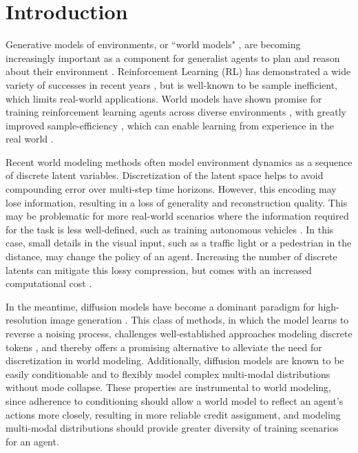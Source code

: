 \section{Introduction}
\label{sec:introduction}

Generative models of environments, or ``world models" \citep{ha2018world}, are becoming increasingly important as a component for generalist agents to plan and reason about their environment \citep{lecun2022path}. Reinforcement Learning (RL) has demonstrated a wide variety of successes in recent years \citep{alphago,degrave2022magnetic,ouyang2022training}, but is well-known to be sample inefficient, which limits real-world applications. World models have shown promise for training reinforcement learning agents across diverse environments \citep{hafner2023dreamerv3,muzero2020}, with greatly improved sample-efficiency \citep{ye2021efficientzero}, which can enable learning from experience in the real world \citep{wu2023daydreamer}.



Recent world modeling methods \citep{hafner2021mastering,iris2023,robine2023transformer,hafner2023dreamerv3,zhang2023storm} often model environment dynamics as a sequence of discrete latent variables. Discretization of the latent space helps to avoid compounding error over multi-step time horizons. However, this encoding may lose information, resulting in a loss of generality and reconstruction quality. This may be problematic for more real-world scenarios where the information required for the task is less well-defined, such as training autonomous vehicles \citep{hu2023gaia}. In this case, small details in the visual input, such as a traffic light or a pedestrian in the distance, may change the policy of an agent. Increasing the number of discrete latents can mitigate this lossy compression, but comes with an increased computational cost \citep{iris2023}. 

In the meantime, diffusion models \citep{sohl2015difforigin,ho2020DDPM,song_sde} have become a dominant paradigm for high-resolution image generation \citep{ldm_stable_diffusion,podell2023sdxl}. This class of methods, in which the model learns to reverse a noising process, challenges well-established approaches modeling discrete tokens \citep{esser2021taming,ramesh2021zero,muse2023}, and thereby offers a promising alternative to alleviate the need for discretization in world modeling. Additionally, diffusion models are known to be easily conditionable and to flexibly model complex multi-modal distributions without mode collapse. These properties are instrumental to world modeling, since adherence to conditioning should allow a world model to reflect an agent's actions more closely, resulting in more reliable credit assignment, and modeling multi-modal distributions should provide greater diversity of training scenarios for an agent.

